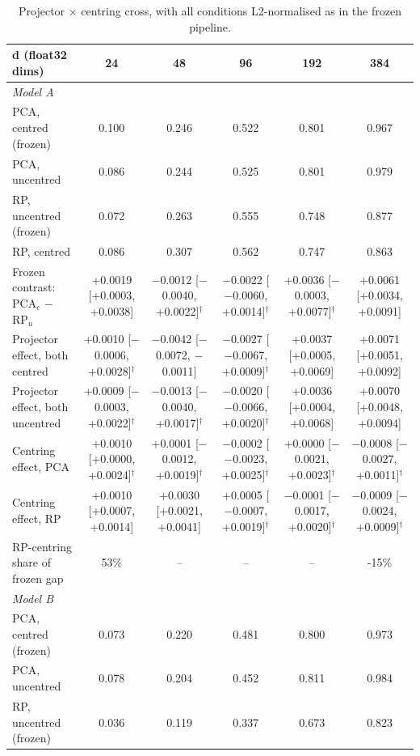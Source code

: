 \begin{table}[t]
\centering\small
\caption{Projector $\times$ centring cross, with all conditions L2-normalised as in the frozen pipeline.}
\label{tab:centring}
\begin{tabular}{lccccc}
\toprule
d (float32 dims) & 24 & 48 & 96 & 192 & 384 \\
\midrule
\multicolumn{6}{l}{\textit{Model A}} \\
PCA, centred (frozen) & 0.100 & 0.246 & 0.522 & 0.801 & 0.967 \\
PCA, uncentred & 0.086 & 0.244 & 0.525 & 0.801 & 0.979 \\
RP, uncentred (frozen) & 0.072 & 0.263 & 0.555 & 0.748 & 0.877 \\
RP, centred & 0.086 & 0.307 & 0.562 & 0.747 & 0.863 \\
\midrule
Frozen contrast: PCA$_c$ $-$ RP$_u$ & +0.0019 [+0.0003, +0.0038] & $-$0.0012 [$-$0.0040, +0.0022]$^\dagger$ & $-$0.0022 [$-$0.0060, +0.0014]$^\dagger$ & +0.0036 [$-$0.0003, +0.0077]$^\dagger$ & +0.0061 [+0.0034, +0.0091] \\
Projector effect, both centred & +0.0010 [$-$0.0006, +0.0028]$^\dagger$ & $-$0.0042 [$-$0.0072, $-$0.0011] & $-$0.0027 [$-$0.0067, +0.0009]$^\dagger$ & +0.0037 [+0.0005, +0.0069] & +0.0071 [+0.0051, +0.0092] \\
Projector effect, both uncentred & +0.0009 [$-$0.0003, +0.0022]$^\dagger$ & $-$0.0013 [$-$0.0040, +0.0017]$^\dagger$ & $-$0.0020 [$-$0.0066, +0.0020]$^\dagger$ & +0.0036 [+0.0004, +0.0068] & +0.0070 [+0.0048, +0.0094] \\
Centring effect, PCA & +0.0010 [+0.0000, +0.0024]$^\dagger$ & +0.0001 [$-$0.0012, +0.0019]$^\dagger$ & $-$0.0002 [$-$0.0023, +0.0025]$^\dagger$ & +0.0000 [$-$0.0021, +0.0023]$^\dagger$ & $-$0.0008 [$-$0.0027, +0.0011]$^\dagger$ \\
Centring effect, RP & +0.0010 [+0.0007, +0.0014] & +0.0030 [+0.0021, +0.0041] & +0.0005 [$-$0.0007, +0.0019]$^\dagger$ & $-$0.0001 [$-$0.0017, +0.0020]$^\dagger$ & $-$0.0009 [$-$0.0024, +0.0009]$^\dagger$ \\
RP-centring share of frozen gap & 53\% & -- & -- & -- & -15\% \\
\midrule
\multicolumn{6}{l}{\textit{Model B}} \\
PCA, centred (frozen) & 0.073 & 0.220 & 0.481 & 0.800 & 0.973 \\
PCA, uncentred & 0.078 & 0.204 & 0.452 & 0.811 & 0.984 \\
RP, uncentred (frozen) & 0.036 & 0.119 & 0.337 & 0.673 & 0.823 \\

\end{tabular}
\end{table}
